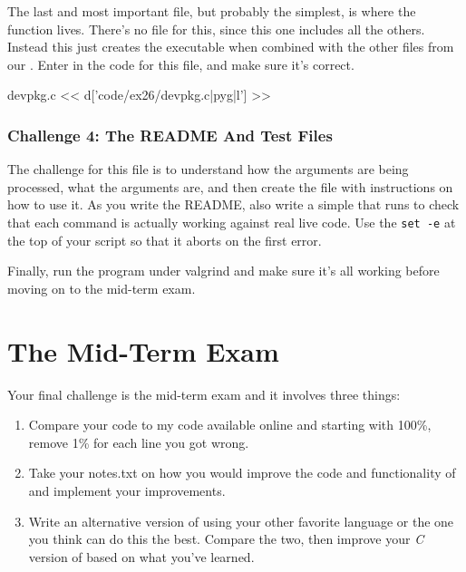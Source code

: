 The last and most important file, but probably the simplest, is 
where the  function lives.  There's no  file for this, since
this one includes all the others.  Instead this just creates the executable
 when combined with the other  files from our 
.  Enter in the code for this file, and make sure it's 
correct.

\begin{code}{devpkg.c}
<< d['code/ex26/devpkg.c|pyg|l'] >>
\end{code}

\subsubsection{Challenge 4: The README And Test Files}

The challenge for this file is to understand how the arguments are
being processed, what the arguments are, and then create the 
file with instructions on how to use it.  As you write the README, also
write a simple  that runs  to check that
each command is actually working against real live code.  Use the \verb|set -e|
at the top of your script so that it aborts on the first error.

Finally, run the program under valgrind and make sure it's all working
before moving on to the mid-term exam.

\section{The Mid-Term Exam}

Your final challenge is the mid-term exam and it involves three things:

\begin{enumerate}
\item Compare your code to my code available online and starting with 100\%, 
    remove 1\% for each line you got wrong.
\item Take your notes.txt on how you would improve the code and functionality
    of  and implement your improvements.
\item Write an alternative version of  using your other 
    favorite language or the one you think can do this the best.  Compare
    the two, then improve your \emph{C} version of  based on what
    you've learned.
\end{enumerate}

